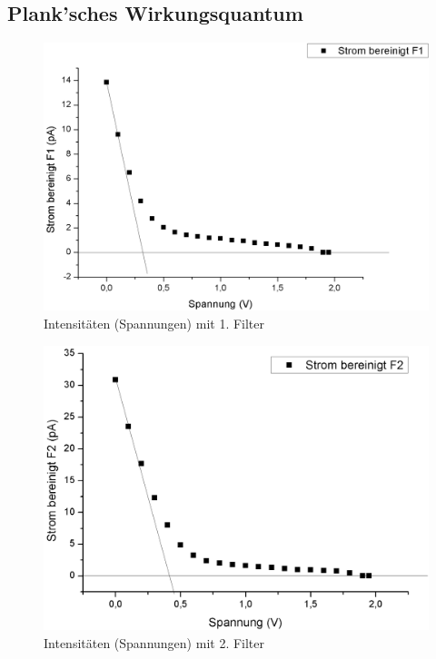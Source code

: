 \documentclass[12pt,a4paper]{article}
\begin{document}
\begin{multicols}{2}
\subsection{Plank'sches Wirkungsquantum}
\begin{figure}[H]
	\centering
	\includegraphics[scale=0.35]{./data/Filter1.png}
	\caption{Intensitäten (Spannungen) mit 1. Filter}
	\label{fig:filter1}
\end{figure}

\begin{figure}[H]
	\centering
	\includegraphics[scale=0.35]{./data/Filter2.png}
	\caption{Intensitäten (Spannungen) mit 2. Filter}
	\label{fig:filter2}
\end{figure}


\end{multicols}
\end{document}

